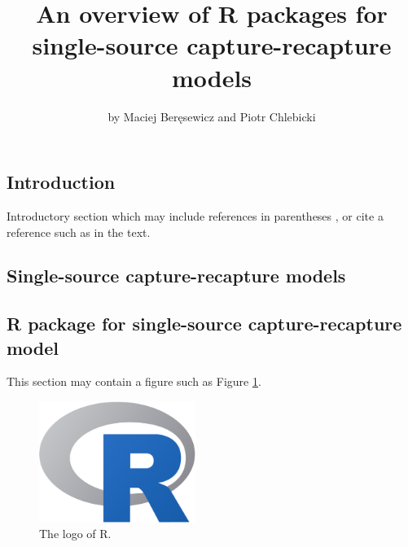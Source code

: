 \title{An overview of R packages for single-source capture-recapture
models}
\author{by Maciej Beręsewicz and Piotr Chlebicki}

\maketitle


\hypertarget{introduction}{%
\subsection{Introduction}\label{introduction}}

Introductory section which may include references in parentheses
\citep{R}, or cite a reference such as \citet{R} in the text.

\hypertarget{single-source-capture-recapture-models}{%
\subsection{Single-source capture-recapture
models}\label{single-source-capture-recapture-models}}

\citet{Bohning2022}

\hypertarget{r-package-for-single-source-capture-recapture-model}{%
\subsection{R package for single-source capture-recapture
model}\label{r-package-for-single-source-capture-recapture-model}}

This section may contain a figure such as Figure \ref{fig:Rlogo}.

\begin{Schunk}
\begin{figure}[htbp]

{\centering \includegraphics[width=2in]{Rlogo} 

}

\caption[The logo of R]{The logo of R.}\label{fig:Rlogo}
\end{figure}
\end{Schunk}

